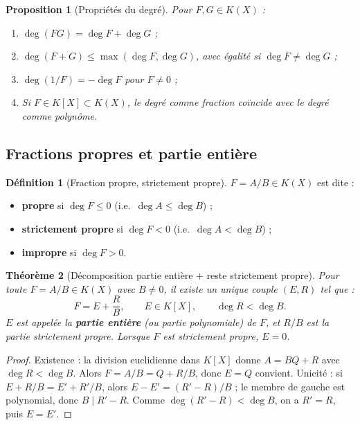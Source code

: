 \documentclass[12pt,a4paper]{report}
\newtheorem{theoreme}{Théorème}[section]
\newtheorem{proposition}[theoreme]{Proposition}
\theoremstyle{definition}
\newtheorem{definition}{Définition}[section]
\theoremstyle{remark}
\begin{document}
\begin{proposition}[Propriétés du degré]
Pour $F, G \in K(X)$ :
\begin{enumerate}
    \item $\deg(FG) = \deg F + \deg G$ ;
    \item $\deg(F + G) \le \max(\deg F, \deg G)$, avec égalité si $\deg F \neq \deg G$ ;
    \item $\deg(1/F) = -\deg F$ pour $F \neq 0$ ;
    \item Si $F \in K[X] \subset K(X)$, le degré comme fraction coïncide avec le degré comme polynôme.
\end{enumerate}
\end{proposition}

\subsection{Fractions propres et partie entière}

\begin{definition}[Fraction propre, strictement propre]
$F = A/B \in K(X)$ est dite :
\begin{itemize}
    \item \textbf{propre} si $\deg F \le 0$ (i.e.\ $\deg A \le \deg B$) ;
    \item \textbf{strictement propre} si $\deg F < 0$ (i.e.\ $\deg A < \deg B$) ;
    \item \textbf{impropre} si $\deg F > 0$.
\end{itemize}
\end{definition}

\begin{theoreme}[Décomposition partie entière + reste strictement propre]
Pour toute $F = A/B \in K(X)$ avec $B \neq 0$, il existe un \emph{unique} couple $(E, R)$ tel que :
\[ F = E + \frac{R}{B}, \qquad E \in K[X], \qquad \deg R < \deg B. \]
$E$ est appelée la \textbf{partie entière} (ou partie polynomiale) de $F$, et $R/B$ est la \emph{partie strictement propre}. Lorsque $F$ est strictement propre, $E = 0$.
\end{theoreme}

\begin{proof}
Existence : la division euclidienne dans $K[X]$ donne $A = B Q + R$ avec $\deg R < \deg B$. Alors $F = A/B = Q + R/B$, donc $E = Q$ convient.
Unicité : si $E + R/B = E' + R'/B$, alors $E - E' = (R' - R)/B$ ; le membre de gauche est polynomial, donc $B \mid R' - R$. Comme $\deg(R' - R) < \deg B$, on a $R' = R$, puis $E = E'$.
\end{proof}
\end{document}
